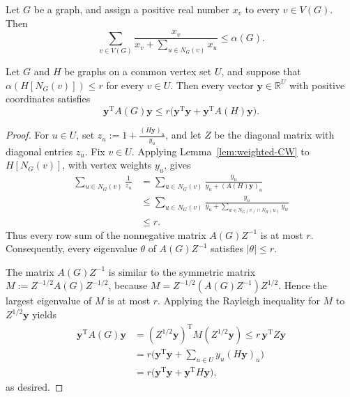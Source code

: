 \documentclass[10pt,a4paper]{amsart}
\begin{document}
\begin{lemma}\label{lem:weighted-CW}
Let $G$ be a graph, and assign a positive real number $x_v$ to every $v\in V(G)$. Then
\[
\sum_{v\in V(G)} \frac{x_v}{x_v + \sum_{u\in N_G(v)} x_u}
\leq \alpha(G).
\]
\end{lemma}

\begin{lemma}\label{lem:matrix}
Let $G$ and $H$ be graphs on a common vertex set $U$, and suppose that
$\alpha (H[N_G(v)])\leq r$ for every $v\in U$. Then every vector 
$\bm{y}\in\mathbb{R}^U$ with positive coordinates satisfies
\[
\bm{y}^{\mathrm{T}} A(G) \bm{y}
\leq r\big(\bm{y}^{\mathrm{T}} \bm{y} + \bm{y}^{\mathrm{T}} A(H) \bm{y}\big).
\]
\end{lemma}

\begin{proof}
For $u\in U$, set $z_u:= 1 + \frac{(H\bm{y})_u}{y_u}$,
and let $Z$ be the diagonal matrix with diagonal entries $z_u$.  Fix
$v\in U$. Applying Lemma~\ref{lem:weighted-CW} to $H[N_G(v)]$, with vertex
weights $y_u$, gives
\begin{align}
\sum_{u\in N_G(v)} \frac{1}{z_u}
& = \sum_{u\in N_G(v)} \frac{y_u}{y_u+(A(H) \bm{y})_u} \nonumber \\
& \leq \sum_{u\in N_G(v)} \frac{y_u}{y_u + \sum_{w\in N_G(v)\cap N_H(u)} y_w} \nonumber \\
& \leq r. \label{eq:rows}
\end{align}
Thus every row sum of the nonnegative matrix $A(G) Z^{-1}$ is at most $r$.
Consequently, every eigenvalue $\theta$ of $A(G)Z^{-1}$ satisfies
$|\theta|\leq r$.  

The matrix $A(G)Z^{-1}$ is similar to the symmetric matrix
$M:= Z^{-1/2}A(G)Z^{-1/2}$, because $M=Z^{-1/2}(A(G)Z^{-1})Z^{1/2}$.  
Hence the largest eigenvalue of $M$ is at most $r$. Applying the Rayleigh 
inequality for $M$ to $Z^{1/2} \bm{y}$ yields
\begin{align*}
\bm{y}^{\mathrm{T}} A(G)\bm{y}
& = (Z^{1/2} \bm{y})^{\mathrm{T}} M(Z^{1/2}\bm{y})\leq r\,\bm{y}^{\mathrm{T}} Z \bm{y} \\
& = r\bigg(\bm{y}^{\mathrm{T}} \bm{y} + \sum_{u\in U} y_u (H\bm{y})_u\bigg) \\
& = r\big(\bm{y}^{\mathrm{T}} \bm{y} + \bm{y}^{\mathrm{T}} H\bm{y}\big),
\end{align*}
as desired.
\end{proof}
\end{document}
